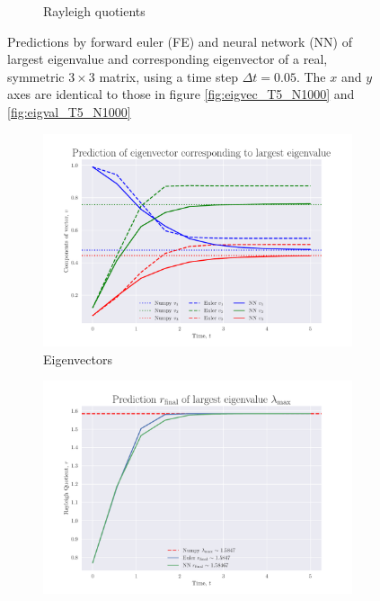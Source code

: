 \documentclass[12pt]{extarticle}
\begin{document}
\begin{figure}[h]
\begin{subfigure}{0.49\textwidth}
		\caption{Rayleigh quotients}
		\label{fig:eigval_T5_N100}
	\end{subfigure}
	\caption{Predictions by forward euler (FE) and neural network (NN) of largest eigenvalue and corresponding eigenvector of a real, symmetric $3\times 3$ matrix, using a time step $\Delta t = 0.05$. The $x$ and $y$ axes are identical to those in figure \ref{fig:eigvec_T5_N1000} and \ref{fig:eigval_T5_N1000}}
	\label{fig:eig_T5_N100}
\end{figure}


\begin{figure}[h]
	
	\centering
	\begin{subfigure}{0.49\textwidth}
		\centering
		\includegraphics[width=\textwidth]{../output/plots/eigvec_T5_N10.pdf}
		\caption{Eigenvectors}
		\label{fig:eigvec_T5_N10}
	\end{subfigure}
	\hfill
	\begin{subfigure}{0.49\textwidth}
		\centering
		\includegraphics[width=\textwidth]{../output/plots/eigval_T5_N10.pdf}

\end{subfigure}
\end{figure}
\end{document}
